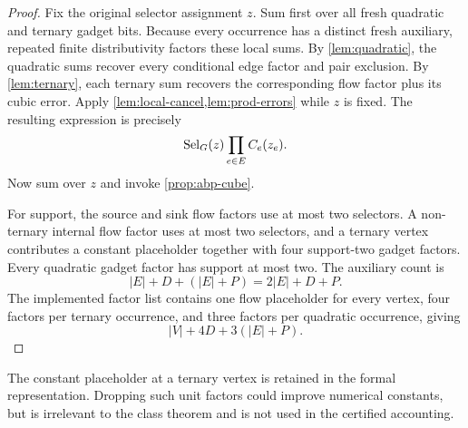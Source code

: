 \begin{proof}
Fix the original selector assignment \(z\).  Sum first over all fresh quadratic and
ternary gadget bits.  Because every occurrence has a distinct fresh auxiliary, repeated
finite distributivity factors these local sums.  By \cref{lem:quadratic}, the quadratic
sums recover every conditional edge factor and pair exclusion.  By
\cref{lem:ternary}, each ternary sum recovers the corresponding flow factor plus its cubic
error.  Apply \cref{lem:local-cancel,lem:prod-errors} while \(z\) is fixed.  The resulting
expression is precisely
\[
  \operatorname{Sel}_G(z)\prod_{e\in E}C_e(z_e).
\]
Now sum over \(z\) and invoke \cref{prop:abp-cube}.

For support, the source and sink flow factors use at most two selectors.  A non-ternary
internal flow factor uses at most two selectors, and a ternary vertex contributes a
constant placeholder together with four support-two gadget factors.  Every quadratic
gadget factor has support at most two.  The auxiliary count is
\[
 |E|+D+(|E|+P)=2|E|+D+P.
\]
The implemented factor list contains one flow placeholder for every vertex, four factors
per ternary occurrence, and three factors per quadratic occurrence, giving
\[
 |V|+4D+3(|E|+P).
\]
\end{proof}

\begin{remark}
The constant placeholder at a ternary vertex is retained in the formal representation.
Dropping such unit factors could improve numerical constants, but is irrelevant to the
class theorem and is not used in the certified accounting.
\end{remark}
